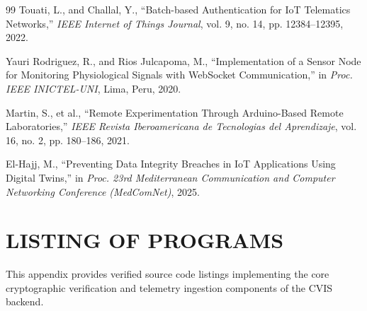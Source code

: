 \documentclass[12pt,a4paper]{report}
\begin{document}
\begin{thebibliography}{99}
Touati, L., and Challal, Y., ``Batch-based Authentication for IoT Telematics Networks,'' \emph{IEEE Internet of Things Journal}, vol. 9, no. 14, pp. 12384--12395, 2022.

Yauri Rodriguez, R., and Rios Julcapoma, M., ``Implementation of a Sensor Node for Monitoring Physiological Signals with WebSocket Communication,'' in \emph{Proc. IEEE INICTEL-UNI}, Lima, Peru, 2020.

Martin, S., et al., ``Remote Experimentation Through Arduino-Based Remote Laboratories,'' \emph{IEEE Revista Iberoamericana de Tecnologias del Aprendizaje}, vol. 16, no. 2, pp. 180--186, 2021.

El-Hajj, M., ``Preventing Data Integrity Breaches in IoT Applications Using Digital Twins,'' in \emph{Proc. 23rd Mediterranean Communication and Computer Networking Conference (MedComNet)}, 2025.

\end{thebibliography}

\appendix
\chapter{LISTING OF PROGRAMS}
\label{app:listings}

This appendix provides verified source code listings implementing the core cryptographic verification and telemetry ingestion components of the CVIS backend.
\end{document}
